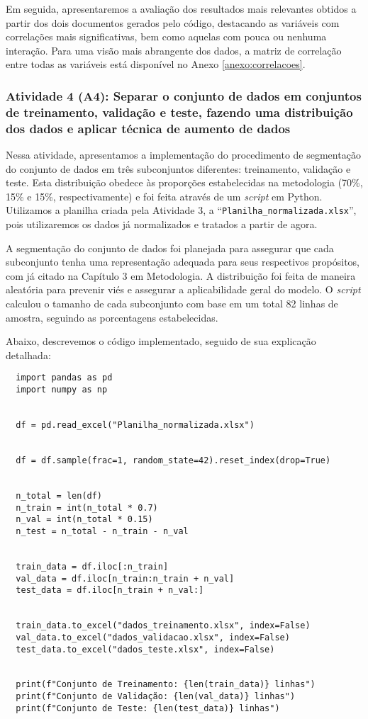 Em seguida, apresentaremos a avaliação dos resultados mais relevantes obtidos a partir dos dois documentos gerados pelo código, destacando as variáveis com correlações mais significativas, bem como aquelas com pouca ou nenhuma interação. Para uma visão mais abrangente dos dados, a matriz de correlação entre todas as variáveis está disponível no Anexo \ref{anexo:correlacoes}.





\subsubsection{Atividade 4 (A4): Separar o conjunto de dados em conjuntos de treinamento, validação e teste, fazendo uma distribuição dos dados e aplicar técnica de aumento de dados}
Nessa atividade, apresentamos a implementação do procedimento de segmentação do conjunto de dados em três subconjuntos diferentes: treinamento, validação e teste. Esta distribuição obedece às proporções estabelecidas na metodologia (70\%, 15\% e 15\%, respectivamente) e foi feita através de um \textit{script} em Python. Utilizamos a planilha criada pela Atividade 3, a ``\texttt{Planilha\_normalizada.xlsx}'', pois utilizaremos os dados já normalizados e tratados a partir de agora.

A segmentação do conjunto de dados foi planejada para assegurar que cada subconjunto tenha uma representação adequada para seus respectivos propósitos, com já citado na Capítulo 3 em Metodologia. A distribuição foi feita de maneira aleatória para prevenir viés e assegurar a aplicabilidade geral do modelo. O \textit{script} calculou o tamanho de cada subconjunto com base em um total 82 linhas de amostra, seguindo as porcentagens estabelecidas.

Abaixo, descrevemos o código implementado, seguido de sua explicação detalhada:

\begin{lstlisting}
  import pandas as pd
  import numpy as np
  
  
  df = pd.read_excel("Planilha_normalizada.xlsx")
  
  
  df = df.sample(frac=1, random_state=42).reset_index(drop=True)
  
  
  n_total = len(df)
  n_train = int(n_total * 0.7)
  n_val = int(n_total * 0.15)
  n_test = n_total - n_train - n_val
  
  
  train_data = df.iloc[:n_train]
  val_data = df.iloc[n_train:n_train + n_val]
  test_data = df.iloc[n_train + n_val:]
  
  
  train_data.to_excel("dados_treinamento.xlsx", index=False)
  val_data.to_excel("dados_validacao.xlsx", index=False)
  test_data.to_excel("dados_teste.xlsx", index=False)
  
  
  print(f"Conjunto de Treinamento: {len(train_data)} linhas")
  print(f"Conjunto de Validação: {len(val_data)} linhas")
  print(f"Conjunto de Teste: {len(test_data)} linhas")
\end{lstlisting}  

